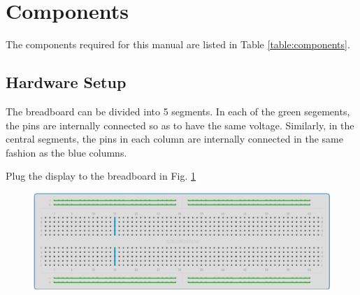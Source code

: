 \documentclass[journal,12pt,twocolumn]{IEEEtran}
\begin{document}




\maketitle
\begin{abstract}
This manual shows how to program the GPIO pins of the ESP32 using the Arduino IDE.  
\end{abstract}
%
\section{Components}
The components required for this manual are listed in Table \ref{table:components}.


\subsection{Hardware Setup}
The breadboard can be divided into 5 segments.  In each of the green segements, the pins are internally connected so as to have the same voltage.  Similarly, in the central segments, the pins in each column  are internally connected in the same fashion as the blue columns. 

\begin{problem}
	Plug the display to the breadboard in Fig. \ref{fig:breadboard}
\end{problem}
\begin{figure}[!h]
\begin{center}
\includegraphics[width=\columnwidth]{./figs/breadboard}
\end{center}
\caption{}
\label{fig:breadboard}
\end{figure}
\end{document}
